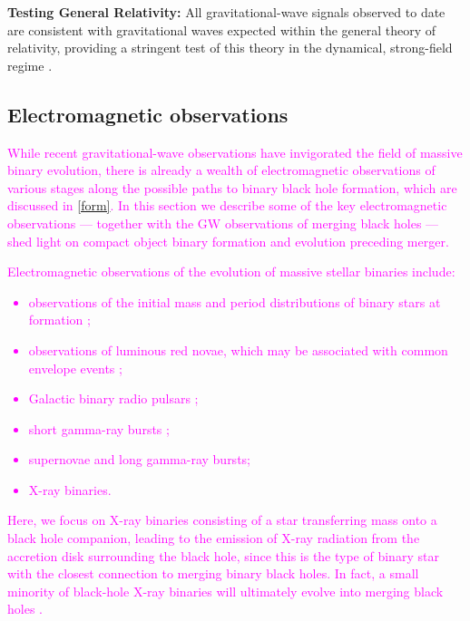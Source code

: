 \documentclass[iop,onecolumn]{revtex4}
\newcommand{\ilya}[1]{\textcolor{magenta}{#1}}
\begin{document}
\textbf{Testing General Relativity:} All gravitational-wave signals observed to date are consistent with gravitational waves expected within the general theory of relativity, providing a stringent test of this theory in the dynamical, strong-field regime \citep{GW150914:GR}.

\subsection{Electromagnetic observations}


\ilya{While recent gravitational-wave observations have invigorated the field of massive binary evolution, there is already a wealth of electromagnetic observations of various stages along the possible paths to binary black hole formation, which are discussed in \autoref{form}.  In this section we describe some of the key electromagnetic observations --- together with the GW observations of merging black holes --- shed light on compact object binary formation and evolution preceding merger.}

\ilya{Electromagnetic observations of the evolution of massive stellar binaries include: 
\begin{itemize}
\item observations of the initial mass and period distributions of binary stars at formation \citep[e.g.,][]{Sana:2012}; 
\item observations of luminous red novae, which may be associated with common envelope events \citep[e.g.,][]{Ivanova:2013LRN};
\item Galactic binary radio pulsars \citep[e.g.,][]{Tauris:2017};
\item short gamma-ray bursts \citep[e.g..][]{Berger:2014};
\item supernovae and long gamma-ray bursts;
\item X-ray binaries.
\end{itemize}
Here, we focus on X-ray binaries consisting of a star transferring mass onto a black hole companion, leading to the emission of X-ray radiation from the accretion disk surrounding the black hole, since this is the type of binary star with the closest connection to merging binary black holes.  In fact, a small minority of black-hole X-ray binaries will ultimately evolve into merging black holes \citep{CygnusX3:2012}.}
\end{document}
